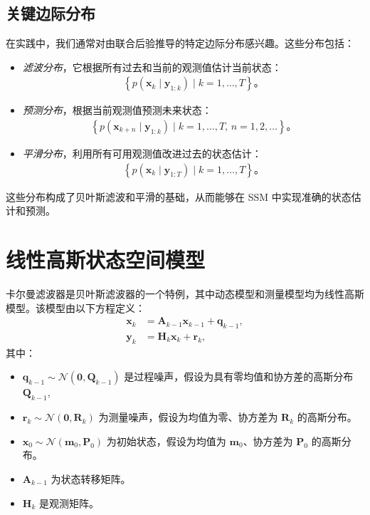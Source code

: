 \subsection{关键边际分布}
在实践中，我们通常对由联合后验推导的特定边际分布感兴趣。这些分布包括：
\begin{itemize}
\item \textit{滤波分布}，它根据所有过去和当前的观测值估计当前状态：
\begin{align}
\left\{ p(\mathbf{x}_k \mid \mathbf{y}_{1:k}) \mid k = 1, \dots, T \right\}。
\end{align}
\item \textit{预测分布}，根据当前观测值预测未来状态：
\begin{align}
\left\{ p(\mathbf{x}_{k+n} \mid \mathbf{y}_{1:k}) \mid k = 1, \dots, T, \, n = 1, 2, \dots \right\}。
\end{align}
\item \textit{平滑分布}，利用所有可用观测值改进过去的状态估计：
\begin{align}
\left\{ p(\mathbf{x}_k \mid \mathbf{y}_{1:T}) \mid k = 1, \dots, T \right\}。
\end{align}
\end{itemize}
这些分布构成了贝叶斯滤波和平滑的基础，从而能够在 SSM 中实现准确的状态估计和预测。

\section{线性高斯状态空间模型}
卡尔曼滤波器是贝叶斯滤波器的一个特例，其中动态模型和测量模型均为线性高斯模型。该模型由以下方程定义：
\begin{align}
\mathbf{x}_k &= \mathbf{A}_{k-1} \mathbf{x}_{k-1} + \mathbf{q}_{k-1}, \\
\mathbf{y}_k &= \mathbf{H}_k \mathbf{x}_k + \mathbf{r}_k,
\end{align}
其中：
\begin{itemize}
\item \(\mathbf{q}_{k-1} \sim \mathcal{N}(\mathbf{0}, \mathbf{Q}_{k-1})\) 是过程噪声，假设为具有零均值和协方差的高斯分布\(\mathbf{Q}_{k-1}\),
\item \(\mathbf{r}_k \sim \mathcal{N}(\mathbf{0}, \mathbf{R}_k)\) 为测量噪声，假设为均值为零、协方差为 \(\mathbf{R}_k\) 的高斯分布。
\item \(\mathbf{x}_0 \sim \mathcal{N}(\mathbf{m}_0, \mathbf{P}_0)\) 为初始状态，假设为均值为 \(\mathbf{m}_0\)、协方差为 \(\mathbf{P}_0\) 的高斯分布。
\item \(\mathbf{A}_{k-1}\) 为状态转移矩阵。
\item \(\mathbf{H}_k\) 是观测矩阵。
\end{itemize}

